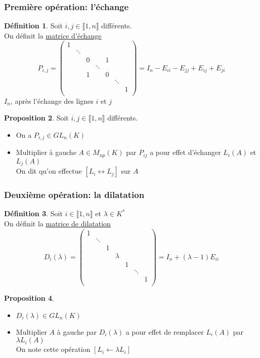 \documentclass[10pt,a4paper]{article}
\theoremstyle{definition}
\newtheorem{proposition}{Proposition}[section]
\newtheorem{definition}[proposition]{Définition}
\begin{document}
\subsubsection{Première opération: l'échange}
\begin{definition}
Soit $i, j \in \llbracket 1, n \rrbracket$ différents. \\
On définit la \uline{matrice d'échange}
\[ P_{i, j} = \begin{pmatrix}
1 & & & & & & \\
& \ddots & & & & & \\
& & 0 & & 1 & & \\
& & & \ddots & & & \\
& & 1 & & 0 & & \\
& & & & & \ddots &\\
& & & & & & 1 \\
\end{pmatrix} = I_n - E_{ii} - E_{jj} + E_{ij} + E_{ji}\]
$I_n$, après l'échange des lignes $i$ et $j$
\end{definition}
\begin{proposition}
Soit $i, j \in \llbracket 1, n \rrbracket$ différents.
\begin{itemize}
\item On a $P_{i, j} \in GL_n(K)$
\item Multiplier à gauche $A \in M_{np}(K)$ par $P_{ij}$ a pour effet d'échanger $L_i(A)$ et $L_j(A)$ \\
On dit qu'on effectue $\left[ L_i \leftrightarrow L_j \right]$ sur $A$ 
\end{itemize}
\end{proposition}

\subsubsection{Deuxième opération: la dilatation}
\begin{definition}
Soit $i \in \llbracket 1, n \rrbracket$ et $\lambda \in K^*$ \\
On définit la \uline{matrice de dilatation}
\[ D_i(\lambda) = \begin{pmatrix}
1 & & & & & & \\
& \ddots & & & & & \\
& & 1 & & & & \\
& & & \lambda & & & \\
& & & & 1 & & \\
& & & & & \ddots & \\
& & & & & & 1 \\
\end{pmatrix} = I_n + (\lambda - 1) E_{ii}\]
\end{definition}
\begin{proposition}
\hfill
\begin{itemize}
\item $D_i(\lambda) \in GL_n(K)$
\item Multiplier $A$ à gauche par $D_i(\lambda)$ a pour effet de remplacer $L_i(A)$ par $\lambda L_i(A)$ \\
On note cette opération $\left[ L_i \leftarrow \lambda L_i \right]$
\end{itemize}
\end{proposition}
\end{document}
